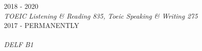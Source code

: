  \hfill 2018 - 2020 \\
\textit{TOEIC Listening & Reading 835, Toeic Speaking & Writing 275}  \\
  \hfill 2017 - PERMANENTLY \\ \\
\textit{DELF B1} \\

